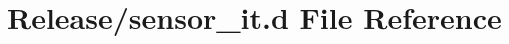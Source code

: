 \hypertarget{sensor__it_8d}{}\section{Release/sensor\+\_\+it.d File Reference}
\label{sensor__it_8d}
